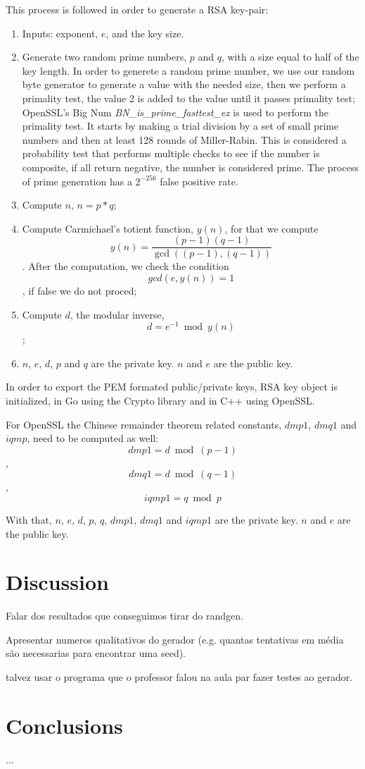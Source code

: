 \documentclass{article} %
\begin{document}
This process is followed in order to generate a RSA key-pair:
\begin{enumerate}
  \item Inputs: exponent, $e$, and the key size.
  \item Generate two random prime numbers, $p$ and $q$, with a size equal to half of the key length.
  In order to generete a random prime number, we use our random byte generator to generate
  a value with the needed size, then we perform a primality test, the value 2 is added to the value until it passes primality test;
  OpenSSL's Big Num \textit{BN\_is\_prime\_fasttest\_ex} is used to perform the primality test. It starts by making a trial division by a set of
  small prime numbers and then at least 128 rounds of Miller-Rabin. This is considered a probability
  test that performs multiple checks to see if the number is composite, if all return negative, the number is considered prime. The process of 
  prime generation has a $2^{-256}$ false positive rate.
  \item Compute $n$, $n=p*q$;
  \item Compute Carmichael's totient function, $y(n)$, for that we compute $$y(n)=\frac{(p-1)(q-1)}{\gcd((p-1),(q-1))}$$.
  After the computation, we check the condition $$gcd(e, y(n)) = 1$$, if false we do not proced;
  \item Compute $d$, the modular inverse, $$d=e^{-1} \bmod{y(n)}$$;
  \item $n$, $e$, $d$, $p$ and $q$ are the private key. $n$ and $e$ are the public key.
\end{enumerate}

In order to export the PEM formated public/private keys, RSA key object is initialized, in Go using the Crypto library and in C++ using OpenSSL.

For OpenSSL the Chinese remainder theorem related constants, $dmp1$, $dmq1$ and $iqmp$, need to be computed as well:
$$dmp1=d \bmod{(p-1)}$$, $$dmq1=d \bmod{(q-1)}$$, $$iqmp1=q \bmod{p}$$

With that, $n$, $e$, $d$, $p$, $q$, $dmp1$, $dmq1$ and $iqmp1$ are the private key. $n$ and $e$ are the public key.

\section{Discussion}
Falar dos resultados que conseguimos tirar do randgen.

Apresentar numeros qualitativos do gerador (e.g. quantas tentativas em média são necessarias para encontrar uma seed).

talvez usar o programa que o professor falou na aula par fazer testes ao gerador.


\section{Conclusions}
...
\end{document}

